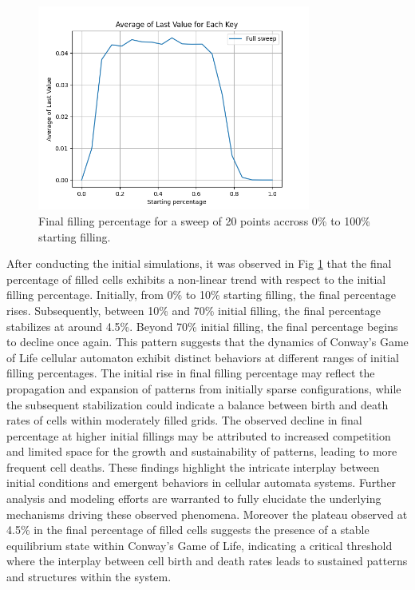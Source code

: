 \documentclass{article}
\begin{document}
\begin{figure}[htbp]
    \centering
    \includegraphics[width=0.8\textwidth]{res/full_start_finish.png}
    \caption{Final filling percentage for a sweep of 20 points accross 0\% to 100\% starting filling.}
    \label{fig:full}
\end{figure}

After conducting the initial simulations, it was observed in Fig \ref*{fig:full} that the final percentage 
of filled cells exhibits a non-linear trend with respect to the initial filling percentage. 
Initially, from 0\% to 10\% starting filling, the final percentage rises. 
Subsequently, between 10\% and 70\% initial filling, the final percentage stabilizes 
at around 4.5\%. Beyond 70\% initial filling, the final percentage begins to decline 
once again. This pattern suggests that the dynamics of Conway's Game of Life cellular 
automaton exhibit distinct behaviors at different ranges of initial filling percentages. 
The initial rise in final filling percentage may reflect the propagation and expansion of 
patterns from initially sparse configurations, while the subsequent stabilization could 
indicate a balance between birth and death rates of cells within moderately filled grids. 
The observed decline in final percentage at higher initial fillings may be attributed to 
increased competition and limited space for the growth and sustainability of patterns, 
leading to more frequent cell deaths. These findings highlight the intricate interplay 
between initial conditions and emergent behaviors in cellular automata systems. Further 
analysis and modeling efforts are warranted to fully elucidate the underlying mechanisms 
driving these observed phenomena. Moreover the plateau observed at 4.5\% in the final 
percentage of filled cells suggests the presence of a stable equilibrium state within 
Conway's Game of Life, indicating a critical threshold where the interplay between cell 
birth and death rates leads to sustained patterns and structures within the system.
\end{document}

